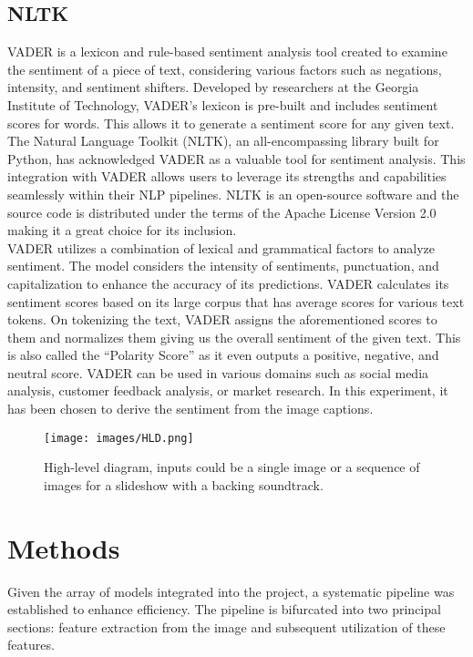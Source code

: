 \documentclass[conference]{IEEEtran}
\begin{document}
\subsection{NLTK}
{
VADER \citep{hutto2014vader} is a lexicon and rule-based sentiment analysis tool created to examine the sentiment of a piece of text, considering various factors such as negations, intensity, and sentiment shifters. Developed by researchers at the Georgia Institute of Technology, VADER's lexicon is pre-built and includes sentiment scores for words. This allows it to generate a sentiment score for any given text.
The Natural Language Toolkit (NLTK), an all-encompassing library built for Python, has acknowledged VADER as a valuable tool for sentiment analysis. This integration with VADER allows users to leverage its strengths and capabilities seamlessly within their NLP pipelines. NLTK is an open-source software and the source code is distributed under the terms of the Apache License Version 2.0 making it a great choice for its inclusion.
\\

VADER utilizes a combination of lexical and grammatical factors to analyze sentiment. The model considers the intensity of sentiments, punctuation, and capitalization to enhance the accuracy of its predictions. VADER calculates its sentiment scores based on its large corpus that has average scores for various text tokens. On tokenizing the text, VADER assigns the aforementioned scores to them and normalizes them giving us the overall sentiment of the given text. This is also called the ``Polarity Score'' as it even outputs a positive, negative, and neutral score.
VADER can be used in various domains such as social media analysis, customer feedback analysis, or market research. In this experiment, it has been chosen to derive the sentiment from the image captions.
}

\begin{figure}[ht]
    \centering
    \texttt{[image: images/HLD.png]}
    \caption{High-level diagram, inputs could be a single image or a sequence of images for a slideshow with a backing soundtrack.}
    \label{fig:high-level-diagram}
\end{figure}

\section{Methods}
Given the array of models integrated into the project, a systematic pipeline was established to enhance efficiency. The pipeline is bifurcated into two principal sections: feature extraction from the image and subsequent utilization of these features.
\end{document}
